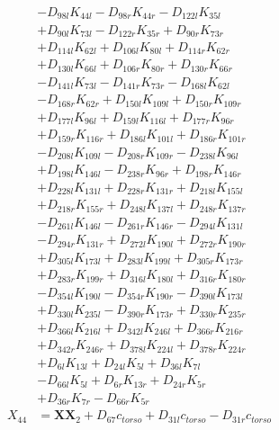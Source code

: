 \begin{multicols}{2}
\begin{align}
&- D_{98l}K_{44l} - D_{98r}K_{44r} - D_{122l}K_{35l}  \nonumber \\
&+ D_{90l}K_{73l} - D_{122r}K_{35r} + D_{90r}K_{73r}  \nonumber \\
&+ D_{114l}K_{62l} + D_{106l}K_{80l} + D_{114r}K_{62r}  \nonumber \\
&+ D_{130l}K_{66l} + D_{106r}K_{80r} + D_{130r}K_{66r}  \nonumber \\
&- D_{141l}K_{73l} - D_{141r}K_{73r} - D_{168l}K_{62l}  \nonumber \\
&- D_{168r}K_{62r} + D_{150l}K_{109l} + D_{150r}K_{109r}  \nonumber \\
&+ D_{177l}K_{96l} + D_{159l}K_{116l} + D_{177r}K_{96r}  \nonumber \\
&+ D_{159r}K_{116r} + D_{186l}K_{101l} + D_{186r}K_{101r}  \nonumber \\
&- D_{208l}K_{109l} - D_{208r}K_{109r} - D_{238l}K_{96l}  \nonumber \\
&+ D_{198l}K_{146l} - D_{238r}K_{96r} + D_{198r}K_{146r}  \nonumber \\
&+ D_{228l}K_{131l} + D_{228r}K_{131r} + D_{218l}K_{155l}  \nonumber \\
&+ D_{218r}K_{155r} + D_{248l}K_{137l} + D_{248r}K_{137r}  \nonumber \\
&- D_{261l}K_{146l} - D_{261r}K_{146r} - D_{294l}K_{131l}  \nonumber \\
&- D_{294r}K_{131r} + D_{272l}K_{190l} + D_{272r}K_{190r}  \nonumber \\
&+ D_{305l}K_{173l} + D_{283l}K_{199l} + D_{305r}K_{173r}  \nonumber \\
&+ D_{283r}K_{199r} + D_{316l}K_{180l} + D_{316r}K_{180r}  \nonumber \\
&- D_{354l}K_{190l} - D_{354r}K_{190r} - D_{390l}K_{173l}  \nonumber \\
&+ D_{330l}K_{235l} - D_{390r}K_{173r} + D_{330r}K_{235r}  \nonumber \\
&+ D_{366l}K_{216l} + D_{342l}K_{246l} + D_{366r}K_{216r}  \nonumber \\
&+ D_{342r}K_{246r} + D_{378l}K_{224l} + D_{378r}K_{224r}  \nonumber \\
&+ D_{6l}K_{13l} + D_{24l}K_{5l} + D_{36l}K_{7l}  \nonumber \\
&- D_{66l}K_{5l} + D_{6r}K_{13r} + D_{24r}K_{5r}  \nonumber \\
&+ D_{36r}K_{7r} - D_{66r}K_{5r} \nonumber \\
X_{44} &= \mathbf{XX}_2 + D_{67}c_{torso} + D_{31l}c_{torso} - D_{31r}c_{torso}  \nonumber \\

\end{align}
\end{multicols}
